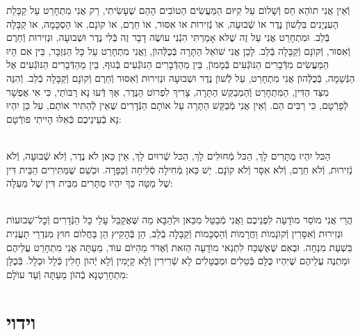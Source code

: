 \documentclass[twoside, openany, parskip=half, 11pt]{book}
\begin{document}
וְֿאֵין אֲנִי תוׂהֵא חַס וְֿשָׁלוׂם עַל קִיּוּם הַמַּעֲשִׂים הַטוׂבִים הָהֵם שֶׁעָשִׂיתִי, רַק אֲנִי מִתְחָרֵט עַל קַבָּלַת הָעִנְיָנִים בִּלְשׁוׂן נֶדֶר אוׂ שְֿׁבוּעָה, אוׂ נְֿזִירוּת אוׂ אִסּוּר, אוׂ חֵרֶם, אוׂ קוׂנָם, אוׂ הַסְכָּמָה, אוׂ קַבָּלָה בְּֿלֵב. וּמִתְחָרֵט אֲנִי עַל זֶה שֶׁלּא אָמַרְתִּי הִנְֿנִי עוׂשֶׂה דָבָר זֶה בְּֿלִי נֶדֶר וּשְׁבוּעָה, וּנְזִירוּת וְֿחֵרֶם וְֿאִסּוּר, וְֿקוׂנָם וְֿקַבָּלָה בְּֿלֵב. לָכֵן אֲנִי שׁוׂאֵל הַתָּרָה בְּֿכֻלְּֿהוׂן, וַאֲנִי מִתְחָרֵט עַל כָּל הַנִּזְכָּר, בֵּין אִם הָיוּ הַמַּעֲשִׂים מִדְּֿבָרִים הַנּוׂגְֿעִים בְּֿמָמוׂן, בֵּין מֵהַדְּֿבָרִים הַנּוׂגְֿעִים בְּֿגוּף, בֵּין מֵהַדְּֿבָרִים הַנּוׂגְֿעִים אֶל הַנְּֿשָׁמָה, בְּֿכֻלְּֿהוׂן אֲנִי מִתְחָרֵט, עַל לְֿשׁוׂן נֶדֶר וּשְׁבוּעָה וּנְזִירוּת וְֿאִסּוּר וְֿחֵרֶם וְֿקוׂנָם וְֿקַבָּלָה בְֿלֵב. וְֿהִנֵּה מִצַּד הַדִּין, הַמִּתְחָרֵט וְֿהַמְבַקֵּשׁ הַתָּרָה, צָרִיךְ לִפְרוׂט הַנֶּדֶר, אַךְ דְּֿעוּ נָא רַבּוׂתַי, כִּי אִי אֶפְשָׁר לְֿפָרְֿטָם, כִּי רַבִּים הֵם. וְֿאֵין אֲנִי מְֿבַקֵּשׁ הַתָּרָה עַל אוׂתָם הַנְּֿדָרִים שֶׁאֵין לְֿהַתִּיר אוׂתָם, עַל כֵּן יִהְיוּ נָא בְֿעֵינֵיכֶם כְּֿאִלּוּ הָיִיתִי פוׂרְֿטָם:

\\
הַכּל יִהְיוּ מֻתָּרִים לָךְ, הַכּל מְֿחוּלִים לָךְ, הַכּל שְֿׁרוּיִם לָךְ, אֵין כַּאן לֺא נֶדֶר, וְֿלֺא שְֿׁבוּעָה, וְֿלֺא נְֿזִירוּת, וְֿלֺא חֵרֶם, וְֿלֺא אִסָּר וְֿלֺא קוׂנָם. יֵשׁ כַּאן מְֿחִילָה סְֿלִיחָה וְֿכַפָּרָה. וּכְשֵׁם שֶׁמַּתִּירִים הַבֵּית דִּין שֶׁל מַטָּה כַּךְ יִהְיוּ מֻתָּרִים מִבֵּית דִּין שֶׁל מַעְלָה:

\\
הֲרֵי אֲנִי מוֺסֵר מוׂדָעָה לִפְנֵיכֶם וַאֲנִי מְֿבַטֵּל מִכַּאן וּלְהַבָּא מַה שֶּׁאֲקַבֵּל עָלַי כָּל הַנְּֿדָרִים וְֿכׇל־שְׁבוּעוׂת וּנְזִירוּת וְֿאִסָּרִין וְֿקוׂנָמוׂת וַחֲרָמוׂת וְֿהַסְכָּמוׂת וְֿקַבָּלָה בְֿלֵב, הֵן בְּֿהָקִיץ הֵן בַּחֲלוׂם חוּץ מִנִּדְרֵי תַעֲנִית בִּשְׁעַת מִנְחָה. וּבְאִם שֶׁאֶשְׁכַּח לִתְנַאי מוׂדָעָה הַזּאת וְֿאֶדּׂר מֵהַיּוׂם עוׂד, מֵעַתָּה אֲנִי מִתְחָרֵט עֲלֵיהֶם וּמַתְנֶה עֲלֵיהֶם שֶׁיִּהְיוּ כֻּלָּם בְּֿטֵלִים וּמְבֻטָּלִים לָא שְֿׁרִירִין וְֿלָא קַיָּמִין וְֿלָא יְֿהוׂן חָלִין כְּֿלָל וּכְלָל. בְּֿכֻלָּן מִתְחָרַטְנָא בְֿהוׂן מֵעַתָּה וְֿעַד עוׂלָם:

\vfill
\sepline




\chapter[וידוי]{ וידוי }
\end{document}

